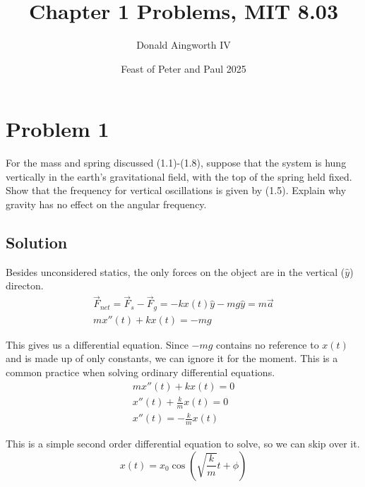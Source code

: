 \documentclass[12pt]{article}
\title{Chapter 1 Problems, MIT 8.03}
\author{Donald Aingworth IV}
\date{Feast of Peter and Paul 2025}
\begin{document}

\maketitle

\pagebreak
\section{Problem 1}
For the mass and spring discussed (1.1)-(1.8), suppose that the system is hung vertically in the earth’s gravitational ﬁeld, with the top of the spring held ﬁxed. Show that the frequency for vertical oscillations is given by (1.5). Explain why gravity has no effect on the angular frequency.


\subsection*{Solution}
Besides unconsidered statics, the only forces on the object are in the vertical ($\hat{y}$) directon. 
\begin{gather}
    \vec{F}_{net} = \vec{F}_s - \vec{F}_g = -kx(t) \hat{y} - mg\hat{y} = m\vec{a}\\
    mx''(t) + kx(t) = -mg
\end{gather}

This gives us a differential equation.
Since \(-mg\) contains no reference to $x(t)$ and is made up of only constants, we can ignore it for the moment.
This is a common practice when solving ordinary differential equations.
\begin{gather}
    mx''(t) + kx(t) = 0\\
    x''(t) + \frac{k}{m}x(t) = 0\\
    x''(t) = -\frac{k}{m}x(t)
\end{gather}

This is a simple second order differential equation to solve, so we can skip over it.
\begin{equation}
    x(t) = x_0 \cos\left(\sqrt{\frac{k}{m}}t + \phi\right)
\end{equation}
\end{document}
